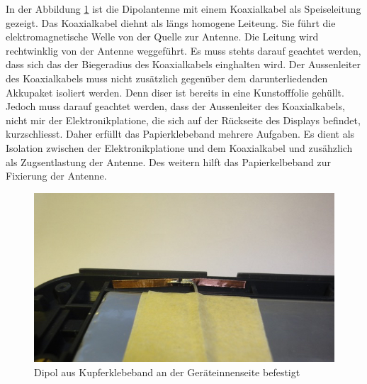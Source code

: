 In der Abbildung \ref{fig:DipolausKupferbandGeraeteinnenseite} ist  die Dipolantenne mit einem Koaxialkabel als Speiseleitung gezeigt. Das Koaxialkabel diehnt als längs homogene Leiteung. Sie führt die elektromagnetische Welle von der Quelle zur Antenne. Die Leitung wird rechtwinklig von der Antenne weggeführt. Es muss stehts darauf geachtet werden, dass sich das der Biegeradius des Koaxialkabels einghalten wird. Der Aussenleiter des Koaxialkabels muss nicht zusätzlich gegenüber dem darunterliedenden Akkupaket isoliert werden. Denn diser ist bereits in eine Kunstofffolie gehüllt. Jedoch muss darauf geachtet werden, dass der Aussenleiter des Koaxialkabels, nicht mir der Elektronikplatione, die sich auf der Rückseite des Displays befindet, kurzschliesst. Daher erfüllt das Papierklebeband mehrere Aufgaben. Es dient als Isolation zwischen der Elektronikplatione und dem Koaxialkabel und zusähzlich als Zugsentlastung der Antenne. Des weitern hilft das Papierkelbeband zur Fixierung der Antenne.\\
\begin{figure}[!ht]
	\centering
	\includegraphics[width=13cm]{content/bilder/Implementierung/DipolIMGeraet.jpg}%
	\caption{Dipol aus Kupferklebeband an der Geräteinnenseite befestigt}
	\label{fig:DipolausKupferbandGeraeteinnenseite}
\end{figure}

